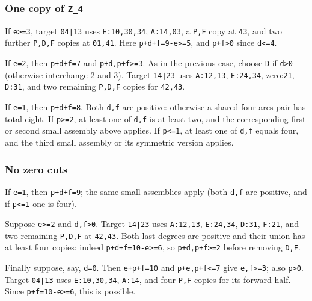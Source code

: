\documentclass[
  10pt,
]{article}
\begin{document}
\hypertarget{one-copy-of-z_4}{%
\subsubsection*{\texorpdfstring{One copy of
\texttt{Z\_4}}{One copy of Z\_4}}\label{one-copy-of-z_4}}

If \texttt{e\textgreater{}=3}, target \texttt{04∣13} uses
\texttt{E:10,30,34}, \texttt{A:14,03}, a \texttt{P,F} copy at
\texttt{43}, and two further \texttt{P,D,F} copies at \texttt{01,41}.
Here \texttt{p+d+f=9-e\textgreater{}=5}, and \texttt{p+f\textgreater{}0}
since \texttt{d\textless{}=4}.

If \texttt{e=2}, then \texttt{p+d+f=7} and
\texttt{p+d,p+f\textgreater{}=3}. As in the previous case, choose
\texttt{D} if \texttt{d\textgreater{}0} (otherwise interchange 2 and 3).
Target \texttt{14∣23} uses \texttt{A:12,13}, \texttt{E:24,34},
zero:\texttt{21}, \texttt{D:31}, and two remaining \texttt{P,D,F} copies
for \texttt{42,43}.

If \texttt{e=1}, then \texttt{p+d+f=8}. Both \texttt{d,f} are positive:
otherwise a shared-four-arcs pair has total eight. If
\texttt{p\textgreater{}=2}, at least one of \texttt{d,f} is at least
two, and the corresponding first or second small assembly above applies.
If \texttt{p\textless{}=1}, at least one of \texttt{d,f} equals four,
and the third small assembly or its symmetric version applies.

\hypertarget{no-zero-cuts-1}{%
\subsubsection*{No zero cuts}\label{no-zero-cuts-1}}

If \texttt{e=1}, then \texttt{p+d+f=9}; the same small assemblies apply
(both \texttt{d,f} are positive, and if \texttt{p\textless{}=1} one is
four).

Suppose \texttt{e\textgreater{}=2} and \texttt{d,f\textgreater{}0}.
Target \texttt{14∣23} uses \texttt{A:12,13}, \texttt{E:24,34},
\texttt{D:31}, \texttt{F:21}, and two remaining \texttt{P,D,F} at
\texttt{42,43}. Both last degrees are positive and their union has at
least four copies: indeed \texttt{p+d+f=10-e\textgreater{}=6}, so
\texttt{p+d,p+f\textgreater{}=2} before removing \texttt{D,F}.

Finally suppose, say, \texttt{d=0}. Then \texttt{e+p+f=10} and
\texttt{p+e,p+f\textless{}=7} give \texttt{e,f\textgreater{}=3}; also
\texttt{p\textgreater{}0}. Target \texttt{04∣13} uses
\texttt{E:10,30,34}, \texttt{A:14}, and four \texttt{P,F} copies for its
forward half. Since \texttt{p+f=10-e\textgreater{}=6}, this is possible.
\end{document}
